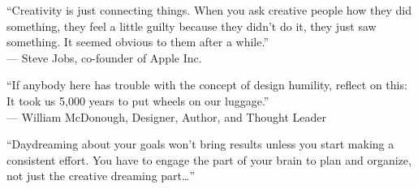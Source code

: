 
\begin{dedication} 

``Creativity is just connecting things. When you ask creative people how they did something, they feel a little guilty because they didn’t do it, they just saw something. It seemed obvious to them after a while.'' \\
— Steve Jobs, co-founder of Apple Inc.\newline \newline

``If anybody here has trouble with the concept of design humility, reflect on this: It took us 5,000 years to put wheels on our luggage.'' \\
— William McDonough, Designer, Author, and Thought Leader

``Daydreaming about your goals won’t bring results unless you start making a consistent effort. You have to engage the part of your brain to plan and organize, not just the creative dreaming part\dots'' \\


\end{dedication}